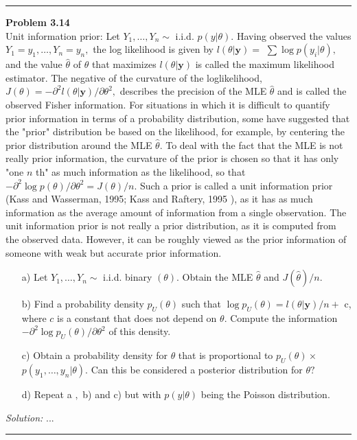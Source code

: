 \documentclass[a4paper, 11pt]{article}
\newenvironment{problem}[2][Problem]
    { \begin{mdframed}[backgroundcolor=gray!20] \textbf{#1 #2} \\}
    {  \end{mdframed}}
\newenvironment{solution}
    {\textit{Solution:}}
    {}
\begin{document}
\noindent\rule{7in}{2.8pt}


\begin{problem}{3.14}
Unit information prior: Let $Y_{1}, \ldots, Y_{n} \sim$ i.i.d. $p(y | \theta) .$ Having observed the values $Y_{1}=y_{1}, \ldots, Y_{n}=y_{n},$ the log likelihood is given by $l(\theta | \boldsymbol{y})=$ $\sum \log p\left(y_{i} | \theta\right),$ and the value $\hat{\theta}$ of $\theta$ that maximizes $l(\theta | \boldsymbol{y})$ is called the maximum likelihood estimator. The negative of the curvature of the loglikelihood, $J(\theta)=-\partial^{2} l(\theta | \boldsymbol{y}) / \partial \theta^{2},$ describes the precision of the MLE $\hat{\theta}$ and is called the observed Fisher information. For situations in which it is difficult to quantify prior information in terms of a probability distribution, some have suggested that the "prior" distribution be based on the likelihood, for example, by centering the prior distribution around the MLE $\hat{\theta} .$ To deal with the fact that the MLE is not really prior information, the curvature of the prior is chosen so that it has only "one $n$ th" as much information as the likelihood, so that $-\partial^{2} \log p(\theta) / \partial \theta^{2}=J(\theta) / n .$ Such a prior is called a unit information prior (Kass and Wasserman, 1995; Kass and Raftery, 1995 ), as it has as much information as the average amount of information from a single observation. The unit information prior is not really a prior distribution, as it is computed from the observed data. However, it can be roughly viewed as the prior information of someone with weak but accurate prior information.
\begin{enumerate}[leftmargin=*, parsep=0pt,itemsep=0pt, topsep=0pt]
	\item [a)] Let $Y_{1}, \ldots, Y_{n} \sim$ i.i.d. binary $(\theta) .$ Obtain the MLE $\hat{\theta}$ and $J(\hat{\theta}) / n$.
	\item[b)] Find a probability density $p_{U}(\theta)$ such that $\log p_{U}(\theta)=l(\theta | \boldsymbol{y}) / n+$
	c, where $c$ is a constant that does not depend on $\theta .$ Compute the information $-\partial^{2} \log p_{U}(\theta) / \partial \theta^{2}$ of this density.
	\item[c)] Obtain a probability density for $\theta$ that is proportional to $p_{U}(\theta) \times$ $p\left(y_{1}, \ldots, y_{n} | \theta\right) .$ Can this be considered a posterior distribution for $\theta ?$
	\item[d)] Repeat a $,$ b) and c) but with $p(y | \theta)$ being the Poisson distribution.
\end{enumerate}
\end{problem}
\begin{solution}
...
	
\end{solution} 

\noindent\rule{7in}{2.8pt}
\end{document}
